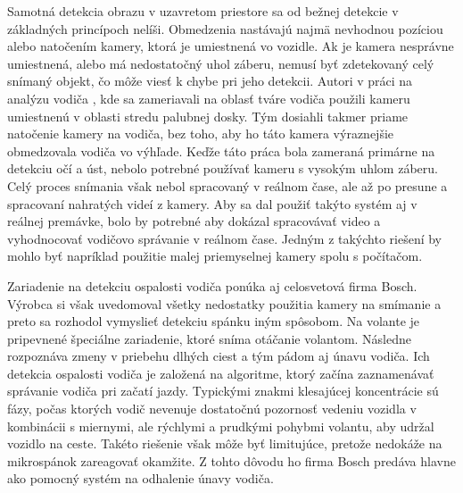 \documentclass[slovak,master,dept460,male,cpp,cpdeclaration]{diploma}
\begin{document}
Samotná detekcia obrazu v uzavretom priestore sa od bežnej detekcie v základných princípoch nelíši. Obmedzenia nastávajú najmä nevhodnou pozíciou alebo natočením kamery, ktorá je umiestnená vo vozidle. Ak je kamera nesprávne umiestnená, alebo má nedostatočný uhol záberu, nemusí byť zdetekovaný celý snímaný objekt, čo môže viesť k chybe pri jeho detekcii. Autori v práci na analýzu vodiča \cite{smith2003determining}, kde sa zameriavali na oblasť tváre vodiča použili kameru umiestnenú v oblasti stredu palubnej dosky. Tým dosiahli takmer priame natočenie kamery na vodiča, bez toho, aby ho táto kamera výraznejšie obmedzovala vodiča vo výhľade. Keďže táto práca bola zameraná primárne na detekciu očí a úst, nebolo potrebné  používať kameru s vysokým uhlom záberu. Celý proces snímania však nebol spracovaný v reálnom čase, ale až po presune a spracovaní nahratých videí z kamery. Aby sa dal použiť takýto systém aj v reálnej premávke, bolo by potrebné aby dokázal spracovávať video  a vyhodnocovať vodičovo správanie v reálnom čase. Jedným z takýchto riešení by mohlo byť napríklad použitie malej priemyselnej kamery spolu s počítačom.\par
Zariadenie na detekciu ospalosti vodiča  ponúka aj celosvetová firma Bosch. Výrobca si však uvedomoval všetky nedostatky použitia kamery na smímanie a preto sa rozhodol vymyslieť detekciu  spánku iným spôsobom. Na volante je pripevnené špeciálne zariadenie, ktoré sníma otáčanie volantom. Následne rozpoznáva zmeny v priebehu dlhých ciest a tým pádom aj únavu vodiča. Ich detekcia ospalosti vodiča je založená na algoritme, ktorý začína zaznamenávať správanie vodiča pri začatí jazdy. Typickými znakmi klesajúcej koncentrácie sú fázy, počas ktorých vodič nevenuje dostatočnú pozornosť vedeniu vozidla v kombinácii s miernymi, ale rýchlymi a prudkými pohybmi volantu, aby udržal vozidlo na ceste. Takéto riešenie však môže byť limitujúce, pretože nedokáže na mikrospánok zareagovať okamžite. Z tohto dôvodu ho firma Bosch predáva hlavne ako pomocný systém na odhalenie únavy vodiča. \par
\end{document}
